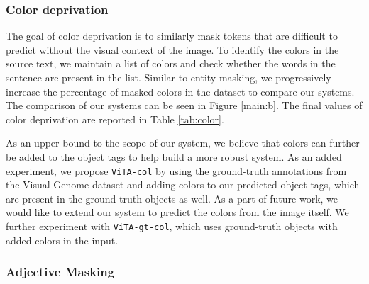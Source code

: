 \documentclass[11pt,a4paper]{article}
\begin{document}
\subsubsection{Color deprivation}

The goal of color deprivation is to similarly mask tokens that are difficult to predict without the visual context of the image.
To identify the colors in the source text, we maintain a list of colors and check whether the words in the sentence are present in the list.
Similar to entity masking, we progressively increase the percentage of masked colors in the dataset to compare our systems. The comparison of our systems can be seen in Figure \ref{main:b}. The final values of color deprivation are reported in Table \ref{tab:color}.

As an upper bound to the scope of our system, we believe that colors can further be added to the object tags to help build a more robust system. As an added experiment, we propose \texttt{ViTA-col} by using the ground-truth annotations from the Visual Genome dataset and adding colors to our predicted object tags, which are present in the ground-truth objects as well.
As a part of future work, we would like to extend our system to predict the colors from the image itself.
We further experiment with \texttt{ViTA-gt-col}, which uses ground-truth objects with added colors in the input.

\subsubsection{Adjective Masking}

\begin{table}[t]
\centering
{}
\caption{The effect of adjective masking on the BLEU score of the proposed models on the test set.}
\label{tab:adjective}
\end{table}
 
\end{document}
